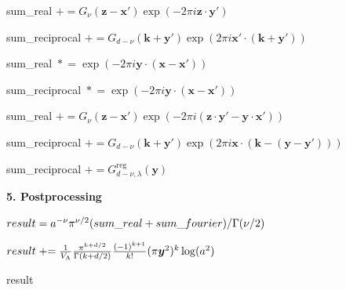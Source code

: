 \documentclass[]{amsart}
\newcommand{\pluseq}{\mathrel{+}=}
\newcommand{\asteq}{\mathrel{*}=}
\numberwithin{mythm}{section}
\newcommand{\algskip}{\vspace*{1.2ex}}
\begin{document}
\begin{algorithm}
\begin{algorithmic}
        \State \textnormal{sum\_real} $\pluseq G_{\nu}(\bm z-\bm x')\exp(-2\pi i\bm z\cdot \bm y')$
    
    \EndFor
    
    
        \State \textnormal{sum\_reciprocal} $\pluseq G_{d-\nu}(\bm k + \bm y')\exp(2 \pi i \bm x' \cdot (\bm k +\bm y'))$

    \EndFor
    
    \State \textnormal{sum\_real} $\asteq\exp(-2\pi i \bm y\cdot (\bm x - \bm x'))$
    
    \State \textnormal{sum\_reciprocal} $\asteq\exp(-2\pi i \bm y\cdot (\bm x - \bm x'))$
    


        
        \State \textnormal{sum\_real} $\pluseq 
        G_{\nu}(\bm z-\bm x')
        \exp(-2\pi i(\bm z\cdot \bm y'-\bm y\cdot \bm x'))$
        

    \EndFor
    
    
        \State \textnormal{sum\_reciprocal} $\pluseq G_{d-\nu}(\bm k + \bm y')\exp(2 \pi i \bm x \cdot (\bm k -(\bm y- \bm y')))$
        
    \EndFor
        
    \State \textnormal{sum\_reciprocal} $\pluseq G_{d-\nu,\lambda}^{\mathrm{reg}}(\bm y)$
    
\EndIf

\algskip

\Statex \textbf{5. Postprocessing}

\State $\textnormal{result} =a^{-\nu}  \pi^{\nu/2} (\textnormal{sum\_real}+\textnormal{sum\_fourier})/\Gamma(\nu/2)$



    $\textnormal{result}\pluseq \frac{1}{V_{\Lambda}}\frac{\pi^{k+d/2}}{\Gamma(k+d/2)}\frac{(-1)^{k+1}}{k!} ( \pi \bm y^2 )^{k} \log (a^2)$

\EndIf

\algskip

\State \Return \textnormal{result}

\end{algorithmic}
\end{algorithm}
\end{document}
